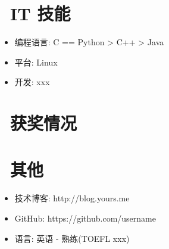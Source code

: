 \documentclass{resume}
\begin{document}

\section{\faCogs\ IT 技能}
\begin{itemize}[parsep=0.5ex]
  \item 编程语言: C == Python > C++ > Java
  \item 平台: Linux
  \item 开发: xxx
\end{itemize}

\section{\faHeart\ 获奖情况}

\section{\faInfo\ 其他}
\begin{itemize}[parsep=0.5ex]
  \item 技术博客: http://blog.yours.me
  \item GitHub: https://github.com/username
  \item 语言: 英语 - 熟练(TOEFL xxx)
\end{itemize}

%
%
\end{document}

